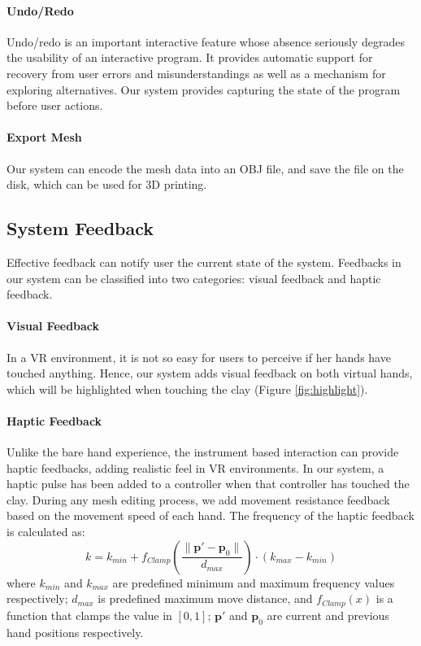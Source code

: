 \documentclass{svjour3}                     %
\begin{document}
\paragraph{Undo/Redo}
Undo/redo is an important interactive feature whose absence seriously degrades the usability of an interactive program.\cite{choudhary1995general} It provides automatic support for recovery from user errors and misunderstandings as well as a mechanism for exploring alternatives. Our system provides capturing the state of the program before user actions.

\paragraph{Export Mesh}
Our system can encode the mesh data into an OBJ file, and save the file on the disk, which can be used for 3D printing.

\subsection{System Feedback}
\label{sec:4.4}
Effective feedback can notify user the current state of the system. Feedbacks in our system can be classified into two categories: visual feedback and haptic feedback.
\paragraph{Visual Feedback}
In a VR environment, it is not so easy for users to perceive if her hands have touched anything. Hence, our system adds visual feedback on both virtual hands, which will be highlighted when touching the clay (Figure \ref{fig:highlight}).
\paragraph{Haptic Feedback}
Unlike the bare hand experience, the instrument based interaction can provide haptic feedbacks, adding realistic feel in VR environments. In our system, a haptic pulse has been added to a controller when that controller has touched the clay. During any mesh editing process, we add movement resistance feedback based on the movement speed of each hand. The frequency of the haptic feedback is calculated as:
\begin{equation}
k = k_{min} + f_{Clamp}(\frac{ \| \mathbf{p'} - \mathbf{p}_{0} \|}{d_{max}}) \cdot (k_{max} - k_{min})
\end{equation}
where $k_{min}$ and $k_{max}$ are predefined minimum and maximum frequency values respectively; $d_{max}$ is predefined maximum move distance, and $f_{Clamp}(x)$ is a function that clamps the value in $[0,1]$; $\mathbf{p'}$ and $\mathbf{p}_{0}$ are current and previous hand positions respectively.
\end{document}
